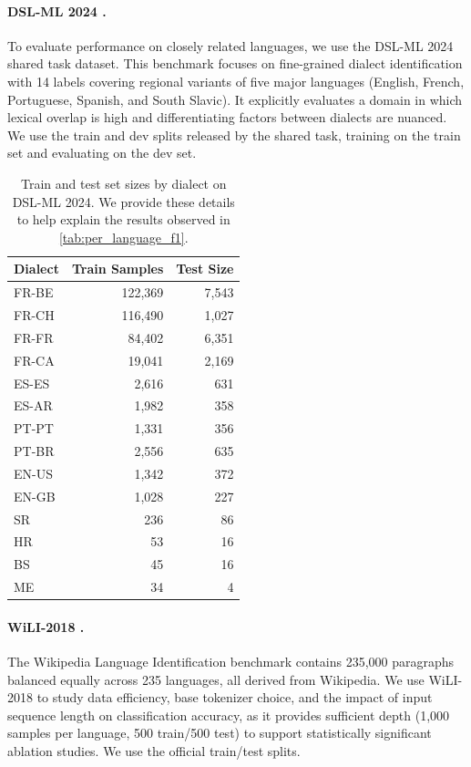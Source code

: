 \documentclass{article}
\begin{document}
\paragraph{DSL-ML 2024 \cite{chifu-etal-2024-vardial}.}
To evaluate performance on closely related languages, we use the DSL-ML 2024 shared task dataset. This benchmark focuses on fine-grained dialect identification with 14 labels covering regional variants of five major languages  (English, French, Portuguese, Spanish, and South Slavic). 
It explicitly evaluates a domain in which lexical overlap is high and differentiating factors between dialects are nuanced. 
We use the train and dev splits released by the shared task, training on the train set and evaluating on the dev set. 

\begin{table}[h]
    \centering
    \begin{tabular}{lrr}
        \toprule
        \textbf{Dialect} & \textbf{Train Samples} & \textbf{Test Size} \\
        \midrule
        FR-BE & 122,369 & 7,543 \\
        FR-CH & 116,490 & 1,027 \\
        FR-FR & 84,402  & 6,351 \\
        FR-CA & 19,041  & 2,169 \\
        ES-ES & 2,616   & 631   \\
        ES-AR & 1,982   & 358   \\
        PT-PT & 1,331   & 356   \\
        PT-BR & 2,556   & 635   \\
        EN-US & 1,342   & 372   \\
        EN-GB & 1,028   & 227   \\
        SR    & 236     & 86    \\
        HR    & 53      & 16    \\
        BS    & 45      & 16    \\
        ME    & 34      & 4     \\
        \bottomrule
    \end{tabular}
    \caption{Train and test set sizes by dialect on DSL-ML 2024. We provide these details to help explain the results observed in \cref{tab:per_language_f1}.}
    \label{tab:dialect_stats}
\end{table}

\paragraph{WiLI-2018 \citep{Thoma2018TheWB}.} The Wikipedia Language Identification benchmark  contains 235,000 paragraphs balanced equally across 235 languages, all derived from Wikipedia.
We use WiLI-2018 to study data efficiency, base tokenizer choice, and the impact of input sequence length on classification accuracy, as it provides sufficient depth (1,000 samples per language, 500 train/500 test) to support statistically significant ablation studies. 
We use the official train/test splits.
\end{document}
